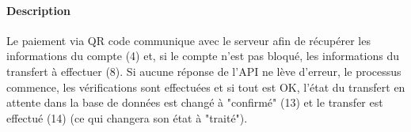 \paragraph{Description} Le paiement via QR code communique avec le serveur afin de récupérer les informations du compte (4) et, si le compte n'est pas bloqué, les informations du transfert à effectuer (8). Si aucune réponse de l'API ne lève d'erreur, le processus commence, les vérifications sont effectuées et si tout est OK, l'état du transfert en attente dans la base de données est changé à "confirmé" (13) et le transfer est effectué (14) (ce qui changera son état à "traité").